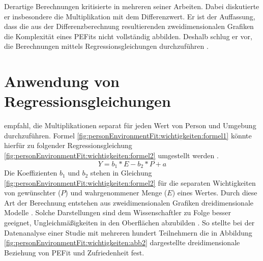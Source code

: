 Derartige Berechnungen kritisierte \textcite[S. 51ff.]{edwards:1991}\cite[S. 9ff.]{edwards:1990}\cite[S. 2ff.]{edwards:1993}\cite[S. 2ff.]{edwards:1993b} in mehreren seiner Arbeiten. Dabei diskutierte er insbesondere die Multiplikation mit dem Differenzwert. Er ist der Auffassung, dass die aus der Differenzberechnung resultierenden zweidimensionalen Grafiken die Komplexität eines \acp{PEFit} nicht vollständig abbilden. Deshalb schlug er vor, die Berechnungen mittels Regressionsgleichungen durchzuführen \cite[S. 51ff.]{edwards:1991}\cite[S. 9ff.]{edwards:1990}\cite[S. 2ff.]{edwards:1993}\cite[S. 1ff.]{edwards:1993b}.

\section{Anwendung von Regressionsgleichungen}
\label{ch:personEnvironmentFit:regressionsgleichungen}
\textcite[S. 51ff.]{edwards:1991}\cite[S. 9ff.]{edwards:1990}\cite[S. 2ff.]{edwards:1993}\cite[S. 2ff.]{edwards:1993b} empfahl, die Multiplikationen separat für jeden Wert von Person und Umgebung durchzuführen. Formel \ref{fig:personEnvironmentFit:wichtigkeiten:formel1} könnte hierfür zu folgender Regressionsgleichung \ref{fig:personEnvironmentFit:wichtigkeiten:formel2} umgestellt werden \cite[S. 9f.]{edwards:1990}\cite[S. 2f.]{edwards:1993b}.
\begin{equation}
	Y = b_1 * E - b_2 * P + a
	\label{fig:personEnvironmentFit:wichtigkeiten:formel2}
\end{equation}
Die Koeffizienten $b_1$ und $b_2$ stehen in Gleichung \ref{fig:personEnvironmentFit:wichtigkeiten:formel2} für die separaten Wichtigkeiten von gewünschter ($P$) und wahrgenommener Menge ($E$) eines Wertes. Durch diese Art der Berechnung entstehen aus zweidimensionalen Grafiken dreidimensionale Modelle \cite[S. 2]{edwards:1993}. Solche Darstellungen sind dem Wissenschaftler zu Folge besser geeignet, Ungleichmäßigkeiten in den Oberflächen abzubilden \cite[S. 51ff.]{edwards:1991}. So stellte \textcite[S. 53ff.]{edwards:1991} bei der Datenanalyse einer Studie mit mehreren hundert Teilnehmern die in Abbildung \ref{fig:personEnvironmentFit:wichtigkeiten:abb2} dargestellte dreidimensionale Beziehung von \ac{PEFit} und Zufriedenheit fest.

